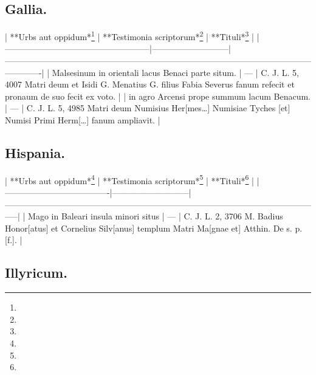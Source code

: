 \documentclass[a4paper, 11pt, oneside, polutonikogreek, german]{article}
\begin{document}
\subsection{Gallia.}

| **Urbs aut oppidum*\footnote{}                              | **Testimonia scriptorum*\footnote{} | **Tituli*\footnote{}                                                                                                              |
|---------------------------------------------------|---------------------------|-------------------------------------------------------------------------------------------------------------------------|
| Malsesinum in orientali lacus Benaci parte situm. | ---                       | C. J. L. 5, 4007 Matri deum et Isidi G. Menatius G. filius Fabia Severus fanum refecit et pronaum de suo fecit ex voto. |
| in agro Arcensi prope summum lacum Benacum.       | ---                       | C. J. L. 5, 4985 Matri deum Numisius Her[mes…] Numisiae Tyches [et] Numisi Primi Herm[…] fanum ampliavit.               |

\subsection{Hispania.}

| **Urbs aut oppidum*\footnote{}                | **Testimonia scriptorum*\footnote{} | **Tituli*\footnote{}                                                                                                      |
|-------------------------------------|---------------------------|-----------------------------------------------------------------------------------------------------------------|
| Mago in Baleari insula minori situs | ---                       | C. J. L. 2, 3706 M. Badius Honor[atus] et Cornelius Silv[anus] templum Matri Ma[gnae et] Atthin. De s. p. [f.]. |

\subsection{Illyricum.}
\end{document}

